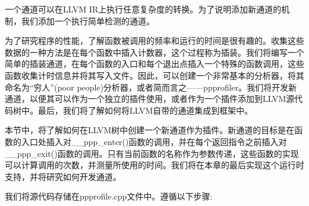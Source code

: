 
一个通道可以在LLVM IR上执行任意复杂度的转换。为了说明添加新通道的机制，我们添加一个执行简单检测的通道。

为了研究程序的性能，了解函数被调用的频率和运行的时间是很有趣的。收集这些数据的一种方法是在每个函数中插入计数器，这个过程称为插装。我们将编写一个简单的插装通道，在每个函数的入口和每个退出点插入一个特殊的函数调用，这些函数收集计时信息并将其写入文件。因此，可以创建一个非常基本的分析器，将其命名为“穷人”(poor people)分析器，或者简而言之——ppprofiler。我们将开发新通道，以便其可以作为一个独立的插件使用，或者作为一个插件添加到LLVM源代码树中。最后，我们将了解如何将LLVM自带的通道集成到框架中。


本节中，将了解如何在LLVM树中创建一个新通道作为插件。新通道的目标是在函数的入口处插入对\_\_ppp\_enter()函数的调用，并在每个返回指令之前插入对\_\_ppp\_exit()函数的调用。只有当前函数的名称作为参数传递，这些函数的实现可以计算调用的次数，并测量所使用的时间。我们将在本章的最后实现这个运行时支持，并将研究如何开发通道。

我们将源代码存储在ppprofile.cpp文件中。遵循以下步骤:

